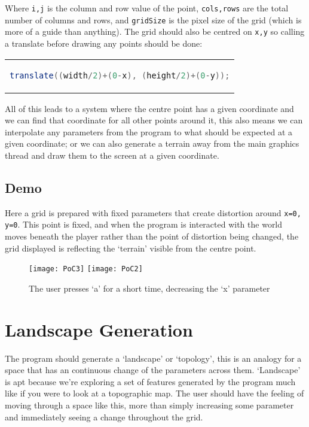 Where \verb|i,j| is the column and row value of the point, \verb|cols,rows|
are the total number of columns and rows, and \verb|gridSize| is the pixel size
of the grid (which is more of a guide than anything). The grid should also
be centred on \verb|x,y| so calling a translate before drawing any points should
be done:

\begin{center}
\begin{tabular}{c}
\begin{lstlisting}[language=java]
translate((width/2)+(0-x), (height/2)+(0-y));
\end{lstlisting}
\end{tabular}
\end{center}

All of this leads to a system where the centre point has a given coordinate and
we can find that coordinate for all other points around it, this also means we
can interpolate any parameters from the program to what should be expected at a
given coordinate; or we can also generate a terrain away from the main graphics
thread and draw them to the screen at a given coordinate.

\subsection{Demo}
Here a grid is prepared with fixed parameters that create distortion around
\verb|x=0, y=0|. This point is fixed, and when the program is interacted with
the world moves beneath the player rather than the point of distortion being
changed, the grid displayed is reflecting the `terrain' visible from the centre
point.

\begin{figure}[H]
\centering
\texttt{[image: PoC3]}
\hspace*{0.5cm}
\texttt{[image: PoC2]}
\caption{The user presses `a' for a short time, decreasing the `x' parameter}
\label{demomovement}
\end{figure}

\section{Landscape Generation}
\label{landgen}
The program should generate a `landscape' or `topology', this is an analogy for
a space that has an continuous change of the parameters across them. `Landscape'
is apt because we're exploring a set of features generated by the program much
like if you were to look at a topographic map. The user should have the feeling
of moving through a space like this, more than simply increasing some parameter
and immediately seeing a change throughout the grid.

